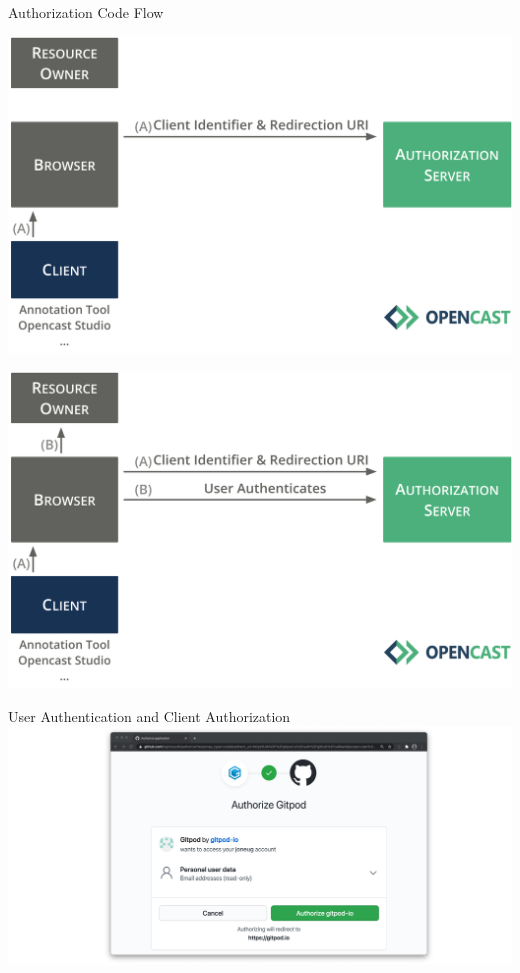\documentclass[aspectratio=169]{beamer}
\begin{document}
\begin{frame}{Authorization Code Flow}
	\vspace*{0.5em}
	\begin{overprint}
		\centerline{\includegraphics[height=0.84\textheight]{figures/authorization-code-flow-02}}
		\centerline{\includegraphics[height=0.84\textheight]{figures/authorization-code-flow-03}}
	\end{overprint}
	\vspace{-2em}
\end{frame}

\begin{frame}{User Authentication and Client Authorization}
	\centering
	\includegraphics[height=0.85\textheight]{figures/motivation-01}
\end{frame}
\end{document}
